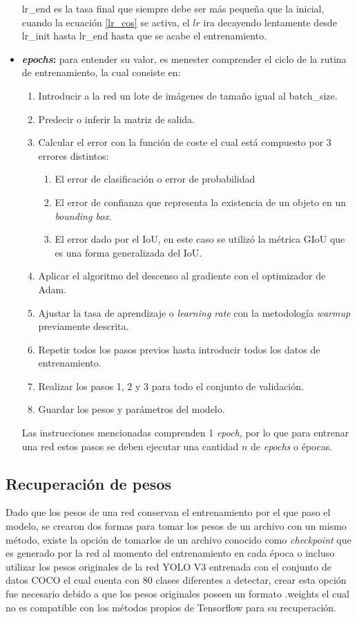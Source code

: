 \begin{itemize}
\begin{equation}
    \end{equation}
    lr\_end es la tasa final que siempre debe ser más pequeña que la inicial, cuando la ecuación \eqref{lr_cos} se activa, el $lr$ ira decayendo lentamente desde lr\_init  hasta lr\_end hasta que se acabe el entrenamiento.
    \item \textbf{\textit{epochs}:} para entender su valor, es menester comprender el ciclo de la rutina de entrenamiento, la cual consiste en:
    \begin{enumerate}
        \item Introducir a la red un lote de imágenes de tamaño igual al batch\_size.
        \item Predecir o inferir la matriz de salida.
        \item Calcular el error con la función de coste el cual está compuesto por 3 errores distintos:
        \begin{enumerate}
            \item El error de clasificación o error de probabilidad
            \item El error de confianza que representa la existencia de un objeto en un \textit{bounding box}.
            \item El error dado por el IoU, en este caso se utilizó la métrica GIoU que es una forma generalizada del IoU.
        \end{enumerate}
        \item Aplicar el algoritmo del descenso al gradiente con el optimizador de Adam.
        \item Ajustar la tasa de aprendizaje o \textit{learning rate} con la metodología \textit{warmup} previamente descrita.
        \item Repetir todos los pasos previos hasta introducir todos los datos de entrenamiento.
        \item Realizar los pasos 1, 2 y 3 para todo el conjunto de validación. 
        \item Guardar los pesos y parámetros del modelo.
    \end{enumerate}
    Las instrucciones mencionadas comprenden 1 \textit{epoch}, por lo que para entrenar una red estos pasos se deben ejecutar una cantidad $n$ de \textit{epochs} o épocas.
\end{itemize}
\subsection{Recuperación de pesos}
Dado que los pesos de una red conservan el entrenamiento por el que paso el modelo, se crearon dos formas para tomar los pesos de un archivo con un mismo método, existe la opción de tomarlos de un archivo conocido como \textit{checkpoint} que es generado por la red al momento del entrenamiento en cada época o incluso utilizar los pesos originales de la red YOLO V3 entrenada con el conjunto de datos COCO el cual cuenta con 80 clases diferentes a detectar, crear esta opción fue necesario debido a que los pesos originales poseen un formato .weights el cual no es compatible con los métodos propios de Tensorflow para su recuperación.
